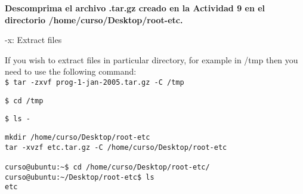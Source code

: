 \documentclass[a4paper,11pt,spanish]{article} %
\newenvironment{myscriptlisting}
{\begin{list}{}{\setlength{\leftmargin}{1em}}\item\scriptsize\bfseries}
{\end{list}}
\begin{document}
\textbf{Descomprima el archivo .tar.gz creado en la Actividad 9 en 
el directorio /home/curso/Desktop/root-etc.}

-x: Extract files

If you wish to extract files in particular directory, for example in /tmp then you need to use
the following command:\\

\texttt{\$ tar -zxvf prog-1-jan-2005.tar.gz -C /tmp}

\texttt{\$ cd /tmp}

\texttt{\$ ls -} \\

\cite{vivkg}

\begin{myscriptlisting}
 \begin{verbatim}
mkdir /home/curso/Desktop/root-etc
tar -xvzf etc.tar.gz -C /home/curso/Desktop/root-etc

curso@ubuntu:~$ cd /home/curso/Desktop/root-etc/
curso@ubuntu:~/Desktop/root-etc$ ls
etc


\end{verbatim}
\end{myscriptlisting}
\end{document}

